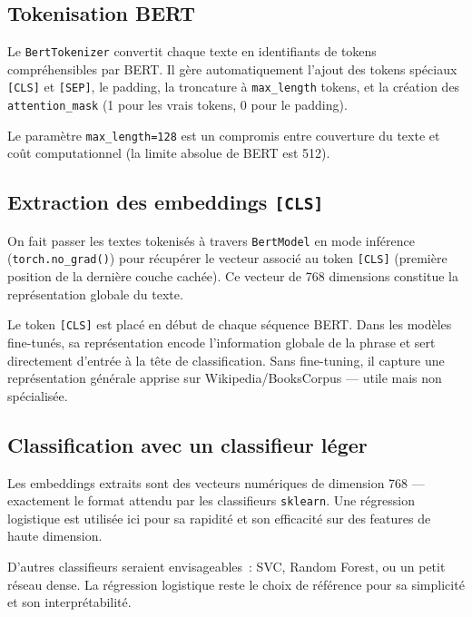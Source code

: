 \documentclass[12pt,a4paper]{report}
\begin{document}
\subsection{Tokenisation BERT}

Le \texttt{BertTokenizer} convertit chaque texte en identifiants de tokens compréhensibles
par BERT. Il gère automatiquement l'ajout des tokens spéciaux \texttt{[CLS]} et
\texttt{[SEP]}, le padding, la troncature à \texttt{max\_length} tokens, et la création des
\texttt{attention\_mask} (1 pour les vrais tokens, 0 pour le padding).

Le paramètre \texttt{max\_length=128} est un compromis entre couverture du texte et coût
computationnel (la limite absolue de BERT est 512).

\subsection{Extraction des embeddings \texttt{[CLS]}}

On fait passer les textes tokenisés à travers \texttt{BertModel} en mode inférence \newline
(\texttt{torch.no\_grad()}) pour récupérer le vecteur associé au token \texttt{[CLS]}
(première position de la dernière couche cachée). Ce vecteur de 768 dimensions constitue
la représentation globale du texte.

\begin{tip}
Le token \texttt{[CLS]} est placé en début de chaque séquence BERT. Dans les modèles
fine-tunés, sa représentation encode l'information globale de la phrase et sert
directement d'entrée à la tête de classification. Sans fine-tuning, il capture une
représentation générale apprise sur Wikipedia/BooksCorpus — utile mais non spécialisée.
\end{tip}

\subsection{Classification avec un classifieur léger}

Les embeddings extraits sont des vecteurs numériques de dimension 768 — exactement le
format attendu par les classifieurs \texttt{sklearn}. Une régression logistique est utilisée
ici pour sa rapidité et son efficacité sur des features de haute dimension.

D'autres classifieurs seraient envisageables~: SVC, Random Forest, ou un petit réseau
dense. La régression logistique reste le choix de référence pour sa simplicité et son
interprétabilité.
\end{document}
